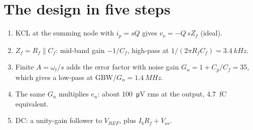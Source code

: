 \documentclass[11pt,a4paper]{article}
\begin{document}
\section{The design in five steps}

\begin{enumerate}
\item KCL at the summing node with $i_p=sQ$ gives $v_o=-Q\,sZ_f$ (ideal).
\item $Z_f=R_f\parallel C_f$: mid-band gain $-1/C_f$, high-pass at $1/(2\pi R_fC_f)=\SI{3.4}{kHz}$.
\item Finite $A=\omega_t/s$ adds the error factor with noise gain $G_n=1+C_p/C_f=35$, which gives a low-pass at $\mathrm{GBW}/G_n=\SI{1.4}{MHz}$.
\item The same $G_n$ multiplies $e_n$: about \SI{100}{\micro V} rms at the output, \SI{4.7}{fC} equivalent.
\item DC: a unity-gain follower to $V_{REF}$, plus $I_bR_f+V_{os}$.
\end{enumerate}
\end{document}

